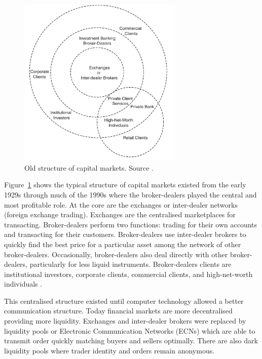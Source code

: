 \begin{figure}[!h]
  \centering
  \includegraphics[width=0.7\textwidth]{img/capitalmarkets}
  \caption{Old structure of capital markets. Source \cite{aldridge2009}.}
  \label{fig:capitalmarket}
\end{figure}
Figure~\ref{fig:capitalmarket} shows the typical structure of capital markets
existed from the early 1929s through much of the 1990s where the broker-dealers
played the central and most profitable role.  At the core are the exchanges or
inter-dealer networks (foreign exchange trading). Exchanges are the centralised
marketplaces for transacting.  Broker-dealers perform two functions: trading for
their own accounts and transacting for their customers. Broker-dealers use
inter-dealer brokers to quickly find the best price for a particular asset among
the network of other broker-dealers. Occasionally, broker-dealers also deal
directly with other broker-dealers, particularly for less liquid instruments.
Broker-dealers clients are institutional investors, corporate clients,
commercial clients, and high-net-worth individuals \cite{aldridge2009}.

This centralised structure existed until computer technology allowed a better
communication structure. Today financial markets are more decentralised
providing more liquidity. Exchanges and inter-dealer brokers were replaced by
liquidity pools or Electronic Communication Networks (ECNs) which are able to
transmit order quickly matching buyers and sellers optimally. There are also
dark liquidity pools where trader identity and orders remain anonymous.

